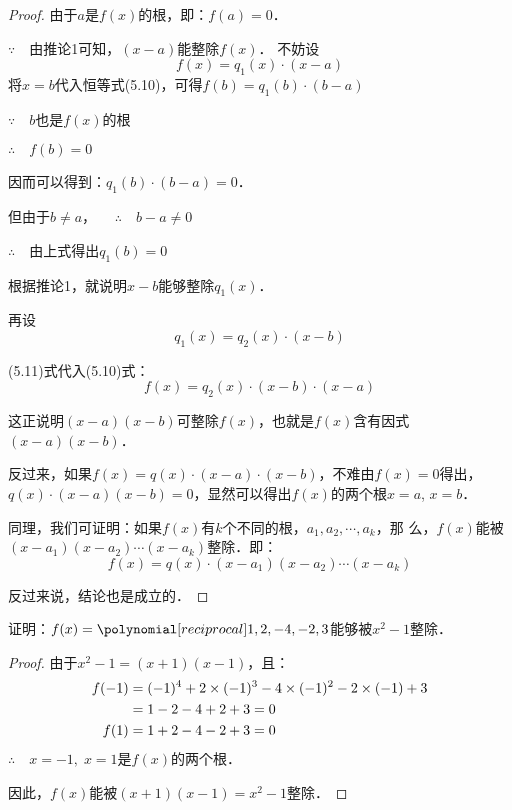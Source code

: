 \begin{proof}
    由于$a$是$f(x)$的根，即：$f(a)=0$．
   
    $\because\quad $由推论1可知，$(x-a)$能整除$f(x)$．
    不妨设
    \begin{equation}
        f(x)=q_1(x)\cdot (x-a)
    \end{equation}
    将$x=b$代入恒等式(5.10)，可得$f (b) =q_1 (b)\cdot (b-a)$

    $\because\quad b$也是$f(x)$的根
    
    $\therefore\quad f(b)=0$
    
    因而可以得到：$q_1(b)\cdot (b-a)=0$．
    
    但由于$b\ne a$，
    $\quad\therefore\quad b-a\ne 0$

    $\therefore\quad$由上式得出$q_1(b)=0$

    根据推论1，就说明$x-b$能够整除$q_1(x)$．
    
    再设
\begin{equation}
    q_1 (x) =q_2 (x) \cdot  (x-b)
\end{equation}
    
(5.11)式代入(5.10)式：
\[f (x) =q_2 (x) \cdot (x-b)\cdot (x-a)\]

这正说明$(x-a)(x-b)$可整除$f(x)$，也就是$f(x)$含有因式$(x-a)(x-b)$．

反过来，如果$f(x)=q(x)\cdot (x-a)·(x-b)$，不难由$f(x)=0$得出，$q(x)\cdot (x-a)(x-b)=0$，显然可以得出$f(x)$的两个根$x=a$, $x=b$．
    
    同理，我们可证明：如果$f(x)$有$k$个不同的根，$a_1,a_2,\cdots,a_k$，那
    么，$f(x)$能被$(x-a_1)(x-a_2)\cdots(x-a_k)$整除．即：
    \[f (x) =q (x) \cdot  (x-a_1) (x-a_2)\cdots (x-a_k)\] 
    
    反过来说，结论也是成立的．

\end{proof}

\begin{example}
证明：$f(x)=\poly{1,2,-4,-2,3}$能够被$x^2-1$整除．
\end{example}

\begin{proof}
由于$x^2-1=(x+1)(x-1)$，且：
\[\begin{split}
    f(-1)&=(-1)^4+2\times(-1)^3-4\times(-1)^2-2\times (-1)+3\\
&=1-2-4+2+3=0\\
f(1)&=1+2-4-2+3=0
\end{split}\]
$\therefore\quad x=-1,\; x=1$是$f(x)$的两个根．

因此，$f(x)$能被$(x+1)(x-1)=x^2-1$整除．

\end{proof}

